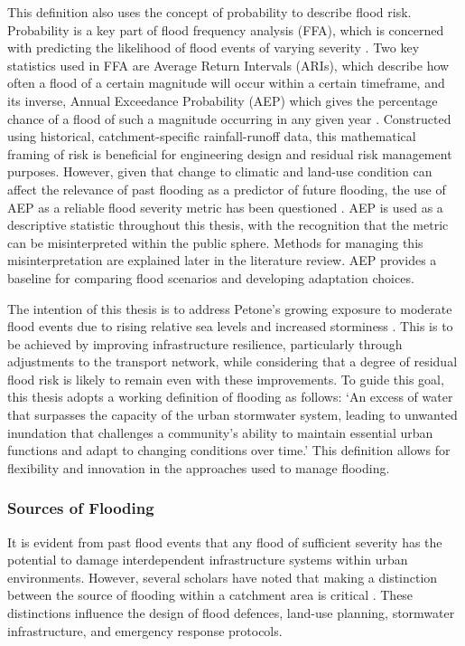 This definition also uses the concept of probability to describe flood risk.
Probability is a key part of flood frequency analysis (FFA), which is concerned
with predicting the likelihood of flood events of varying severity
\parencite{dalrymple1960}. Two key statistics used in FFA are Average Return
Intervals (ARIs), which describe how often a flood of a certain magnitude will
occur within a certain timeframe, and its inverse, Annual Exceedance Probability
(AEP) which gives the percentage chance of a flood of such a magnitude occurring
in any given year \parencite{Morrill2018}. Constructed using historical,
catchment-specific rainfall-runoff data, this mathematical framing of risk is
beneficial for engineering design and residual risk management purposes.
However, given that change to climatic and land-use condition can affect the
relevance of past flooding as a predictor of future flooding, the use of AEP as
a reliable flood severity metric has been questioned \parencite{Machado2015}.
AEP is used as a descriptive statistic throughout this thesis, with the
recognition that the metric can be misinterpreted within the public sphere.
Methods for managing this misinterpretation are explained later in the
literature review. AEP provides a baseline for comparing flood scenarios and
developing adaptation choices.

The intention of this thesis is to address Petone’s growing exposure to moderate
flood events due to rising relative sea levels and increased storminess
\parencite{MfE2023}. This is to be achieved by improving infrastructure
resilience, particularly through adjustments to the transport network, while
considering that a degree of residual flood risk is likely to remain even with
these improvements. To guide this goal, this thesis adopts a working definition
of flooding as follows: ‘An excess of water that surpasses the capacity of the
urban stormwater system, leading to unwanted inundation that challenges a
community’s ability to maintain essential urban functions and adapt to changing
conditions over time.’ This definition allows for flexibility and innovation in
the approaches used to manage flooding.

\subsubsection{Sources of Flooding}
It is evident from past flood events that any flood of sufficient severity has
the potential to damage interdependent infrastructure systems within urban
environments. However, several scholars have noted that making a distinction
between the source of flooding within a catchment area is critical
\parencite{White2013, chormanski2011, Pozo2023}. These distinctions influence
the design of flood defences, land-use planning, stormwater infrastructure, and
emergency response protocols. 

